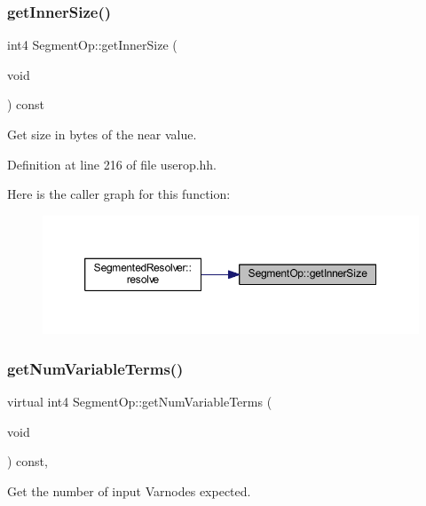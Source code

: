 \subsubsection{\texorpdfstring{getInnerSize()}{getInnerSize()}}
{\footnotesize\ttfamily int4 Segment\+Op\+::get\+Inner\+Size (\begin{DoxyParamCaption}\item[{void}]{ }\end{DoxyParamCaption}) const\hspace{0.3cm}{\ttfamily [inline]}}



Get size in bytes of the near value. 



Definition at line 216 of file userop.\+hh.

Here is the caller graph for this function\+:
\nopagebreak
\begin{figure}[H]
\begin{center}
\leavevmode
\includegraphics[width=350pt]{class_segment_op_a5b186649dadd3ed754fdfe26ba84c96b_icgraph}
\end{center}
\end{figure}
\mbox{\label{class_segment_op_a0a5b69caea8e60eaebe045f49c9351e1}} 
\subsubsection{\texorpdfstring{getNumVariableTerms()}{getNumVariableTerms()}}
{\footnotesize\ttfamily virtual int4 Segment\+Op\+::get\+Num\+Variable\+Terms (\begin{DoxyParamCaption}\item[{void}]{ }\end{DoxyParamCaption}) const\hspace{0.3cm}{\ttfamily [inline]}, {\ttfamily [virtual]}}



Get the number of input Varnodes expected. 



